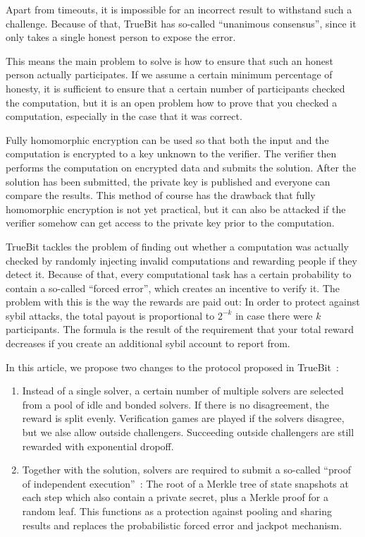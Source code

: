 \documentclass[a4paper]{article}
\begin{document}
Apart from timeouts, it is impossible for an incorrect result to withstand such a challenge.
Because of that, TrueBit has so-called ``unanimous consensus'', since it only takes a single
honest person to expose the error.

This means the main problem to solve is how to ensure that such an honest person actually
participates. If we assume a certain minimum percentage of honesty, it is sufficient to
ensure that a certain number of participants checked the computation,
but it is an open problem how to prove that you checked a computation,
especially in the case that it was correct.

Fully homomorphic encryption can be used so that both the input and the computation is encrypted
to a key unknown to the verifier. The verifier then performs the computation on encrypted data and submits the
solution. After the solution has been submitted, the private key is published and everyone can compare the
results. This method of course has the drawback that fully homomorphic encryption is not yet practical, but it can
also be attacked if the verifier somehow can get access to the private key prior to the computation.

TrueBit tackles the problem of finding out whether a computation was actually checked
by randomly injecting invalid computations and rewarding people if they detect it.
Because of that, every computational task has a certain probability to contain a so-called
``forced error'', which creates an incentive to verify it. The problem with this is the way the rewards
are paid out: In order to protect against sybil attacks, the total payout is proportional to  $2^{-k}$ in case
there were $k$ participants. The formula is the result of the requirement that your total
reward decreases if you create an additional sybil account to report from.

In this article, we propose two changes to the protocol proposed in TrueBit~\cite{truebit}:
\begin{enumerate}
\item Instead of a single solver, a certain number of multiple solvers are selected from a pool of
idle and bonded solvers. If there is no disagreement, the reward is split evenly.
Verification games are played if the solvers disagree,
but we alse allow outside challengers. Succeeding outside challengers are still rewarded with exponential dropoff.
\item Together with the solution, solvers are required to submit a so-called
``proof of independent execution''~\cite{indiex}: The root of a Merkle tree
of state snapshots at each step which also contain a private secret, plus
a Merkle proof for a random leaf. This functions as a protection against pooling
and sharing results and replaces the probabilistic forced error and jackpot mechanism.
\end{enumerate}
\end{document}
